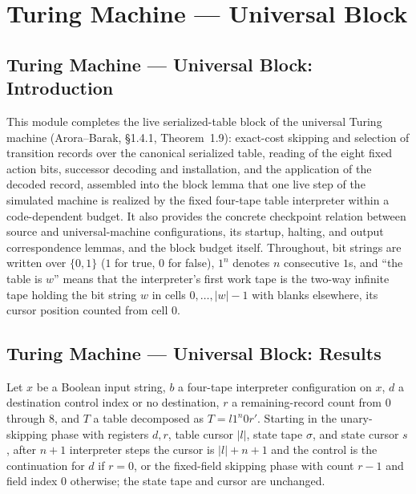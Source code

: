 \section{Turing Machine --- Universal Block}
\subsection*{Turing Machine --- Universal Block: Introduction}

This module completes the live serialized-table block of the universal Turing
machine (Arora--Barak, \S 1.4.1, Theorem~1.9): exact-cost skipping and
selection of transition records over the canonical serialized table, reading
of the eight fixed action bits, successor decoding and installation, and the
application of the decoded record, assembled into the block lemma that one
live step of the simulated machine is realized by the fixed four-tape table
interpreter within a code-dependent budget.  It also provides the concrete
checkpoint relation between source and universal-machine configurations,
its startup, halting, and output correspondence lemmas, and the block budget
itself.  Throughout, bit strings are written over $\{0,1\}$ ($1$ for true,
$0$ for false), $1^n$ denotes $n$ consecutive $1$s, and ``the table is
$w$'' means that the interpreter's first work tape is the two-way infinite
tape holding the bit string $w$ in cells $0, \dots, |w| - 1$ with blanks
elsewhere, its cursor position counted from cell $0$.

\subsection*{Turing Machine --- Universal Block: Results}

\begin{lemma}
\label{Turing.universal_skip_unary}
\leanok
{}
Let $x$ be a Boolean input string, $b$ a four-tape interpreter configuration on $x$, $d$
a destination control index or no destination, $r$ a remaining-record count from $0$
through $8$, and $T$ a table decomposed as $T=l1^n0r'$. Starting in the unary-skipping
phase with registers $d,r$, table cursor $|l|$, state tape $\sigma$, and state cursor
$s$, after $n+1$ interpreter steps the cursor is $|l|+n+1$ and the control is the
continuation for $d$ if $r=0$, or the fixed-field skipping phase with count $r-1$ and
field index $0$ otherwise; the state tape and cursor are unchanged.
\end{lemma}

